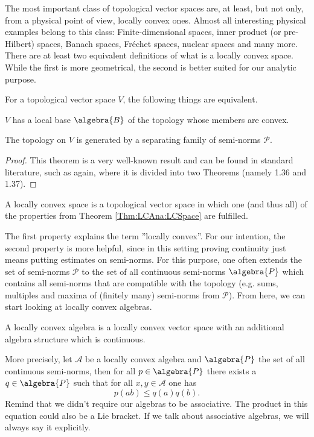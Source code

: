 The most important class of topological vector spaces are, at least, but not 
only, from a physical point of view, locally convex ones. Almost all 
interesting physical examples belong to this class: Finite-dimensional spaces, 
inner product (or pre-Hilbert) spaces, Banach spaces, Fr\'echet spaces, 
nuclear spaces and many more. There are at least two equivalent 
definitions of what is a locally convex space. While the first is more 
geometrical, the second is better suited for our analytic purpose.
\begin{theorem}
	\label{Thm:LCAna:LCSpace}
	For a topological vector space $V$, the following things are equivalent.
	\begin{theoremlist}
		\item
		$V$ has a local base $\algebra{B}$ of the topology whose members are 
		convex.
		
		\item
		The topology on $V$ is generated by a separating family of semi-norms 
		$\mathcal{P}$.
	\end{theoremlist}
\end{theorem}
\begin{proof}
	This theorem is a very well-known result and can be found in standard 
	literature, such as \cite{Rudin:Blue} again, where it is divided into 
	two 	Theorems (namely 1.36 and 1.37).
\end{proof}
\begin{definition}
	\label{Def:LCSpace}
	A locally convex space is a topological vector space in which one (and 
	thus all) of the properties from Theorem \ref{Thm:LCAna:LCSpace} are 
	fulfilled.
\end{definition}
The first property explains the term ''locally convex''. 
For our intention, the second property is more helpful, 
since in this setting proving continuity just means putting estimates on 
semi-norms. For this purpose, one often extends the set of semi-norms 
$\mathcal{P}$ to the set of all continuous semi-norms $\algebra{P}$ which 
contains all semi-norms that are compatible with the topology (e.g. sums, 
multiples and maxima of (finitely many) semi-norms from $\mathcal{P}$).
From here, we can start looking at locally convex algebras.


\begin{definition}
	\label{Def:LCAlgebra}
	A locally convex algebra is a locally convex vector space with an 
	additional algebra structure which is continuous.
\end{definition}
More precisely, let $\mathcal{A}$ be a locally convex algebra and 
$\algebra{P}$ the set of all continuous semi-norms, then for all $p \in 
\algebra{P}$ there exists a $q \in \algebra{P}$ such that for all $x, y \in 
\mathcal{A}$ one has
\begin{equation}
	\label{LCAna:ProductContinuity}
	p(a b)
	\leq
	q(a) q(b).
\end{equation}
Remind that we didn't require our algebras to be associative. The product in 
this equation could also be a Lie bracket. If we talk about associative 
algebras, we will always say it explicitly.



